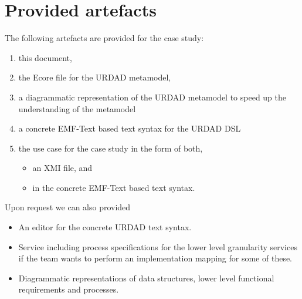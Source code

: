 \section{Provided artefacts}

The following artefacts are provided for the case study:
\begin{enumerate}
  \item this document,
  \item the Ecore file for the URDAD metamodel,
  \item a diagrammatic representation of the URDAD metamodel to speed up the understanding of the metamodel
  \item a concrete EMF-Text based text syntax for the URDAD DSL
  \item the use case for the case study in the form of both, 
    \begin{itemize}
     \item an XMI file, and
     \item in the concrete EMF-Text based text syntax.
    \end{itemize}
\end{enumerate}

Upon request we can also provided
\begin{itemize}
  \item An editor for the concrete URDAD text syntax.
  \item Service including process specifications for the lower level granularity services if the team wants to perform an implementation mapping for some of these.
  \item Diagrammatic representations of data structures, lower level functional requirements and processes.
\end{itemize}

